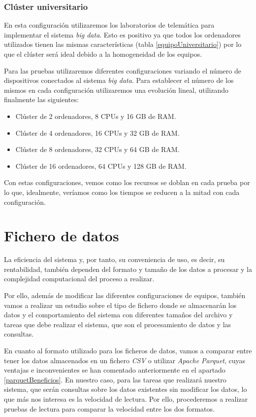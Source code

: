 \subsubsection{Clúster universitario}
\label{clusterUni}
En esta configuración utilizaremos los laboratorios de telemática para implementar el sistema \textit{big data}. Esto es positivo ya que todos los ordenadores utilizados tienen las mismas características (tabla \ref{equipoUniversitario}) por lo que el clúster será ideal debido a la homogeneidad de los equipos.

Para las pruebas utilizaremos diferentes configuraciones variando el número de dispositivos conectados al sistema \textit{big data}. Para establecer el número de los mismos en cada configuración utilizaremos una evolución lineal, utilizando finalmente las siguientes:

\begin{itemize}
	\item Clúster de 2 ordenadores, 8 \gls{CPU}s y 16 GB de \gls{RAM}.
	\item Clúster de 4 ordenadores, 16 \gls{CPU}s y 32 GB de \gls{RAM}.
	\item Clúster de 8 ordenadores, 32 \gls{CPU}s y 64 GB de \gls{RAM}.
	\item Clúster de 16 ordenadores, 64 \gls{CPU}s y 128 GB de \gls{RAM}.
\end{itemize}

Con estas configuraciones, vemos como los recursos se doblan en cada prueba por lo que, idealmente, veríamos como los tiempos se reducen a la mitad con cada configuración.

\section{Fichero de datos \label{compFichDatos}}
La eficiencia del sistema y, por tanto, su conveniencia de uso, es decir, su rentabilidad, también dependen del formato y tamaño de los datos a procesar y la complejidad computacional del proceso a realizar. 

Por ello, además de modificar las diferentes configuraciones de equipos, también vamos a realizar un estudio sobre el tipo de fichero donde se almacenarán los datos y el comportamiento del sistema con diferentes tamaños del archivo y tareas que debe realizar el sistema, que son el procesamiento de datos y las consultas.

En cuanto al formato utilizado para los ficheros de datos, vamos a comparar entre tener los datos almacenados en un fichero \textit{\gls{CSV}} o utilizar \textit{Apache Parquet}, cuyas ventajas e inconvenientes se han comentado anteriormente en el apartado \ref{parquetBeneficios}. En nuestro caso, para las tareas que realizará nuestro sistema, que serán consultas sobre los datos existentes sin modificar los datos, lo que más nos interesa es la velocidad de lectura. Por ello, procederemos a realizar pruebas de lectura para comparar la velocidad entre los dos formatos.


